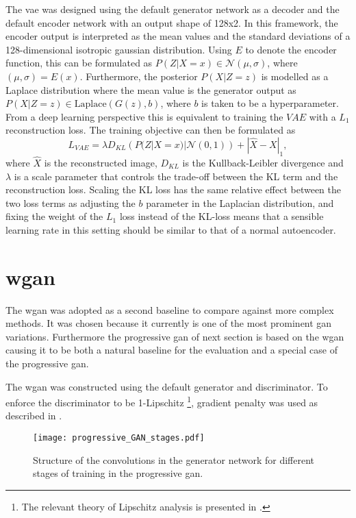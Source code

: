 The \acrlong{vae} was designed using the default generator network as a decoder and the default encoder network with an output shape of 128x2. In this framework, the encoder output is interpreted as the mean values and the standard deviations of a 128-dimensional isotropic gaussian distribution. Using $E$ to denote the encoder function, this can be formulated as $P(Z|X=x) \in \mathcal{N}(\mu, \sigma)$, where $(\mu, \sigma) = E(x)$. Furthermore, the posterior $P(X|Z=z)$ is modelled as a Laplace distribution where the mean value is the generator output as $P(X|Z=z) \in \text{Laplace}(G(z), b)$, where $b$ is taken to be a hyperparameter. From a deep learning perspective this is equivalent to training the $VAE$ with a $L_1$ reconstruction loss. The training objective can then be formulated as 
\begin{equation}
    L_{VAE} = \lambda D_{KL}\left(P(Z|X=x) | \mathcal{N}(0,1)\right) + |\hat{X} - X|_1,
\end{equation}
where $\hat{X}$ is the reconstructed image, $D_{KL}$ is the Kullback-Leibler divergence \parencite{kullback1951information} and $\lambda$ is a scale parameter that controls the trade-off between the KL term and the reconstruction loss. Scaling the KL loss has the same relative effect between the two loss terms as adjusting the $b$ parameter in the Laplacian distribution, and fixing the weight of the $L_1$ loss instead of the KL-loss means that a sensible learning rate in this setting should be similar to that of a normal autoencoder. 

\section{\acrlong{wgan}}
The \acrfull{wgan} was adopted as a second baseline to compare against more complex methods. It was chosen because it currently is one of the most prominent \acrshort{gan} variations. Furthermore the progressive \acrshort{gan} of next section is based on the \acrshort{wgan} causing it to be both a natural baseline for the evaluation and a special case of the progressive \acrshort{gan}. 

The \acrshort{wgan} was constructed using the default generator and discriminator. To enforce the discriminator to be 1-Lipschitz \footnote{The relevant theory of Lipschitz analysis is presented in \parencite{heinonen2005lectures}.}, gradient penalty was used as described in \parencite{gulrajani2017improved}.

\begin{figure}[t]
    \texttt{[image: progressive\_GAN\_stages.pdf]}
    \caption{Structure of the convolutions in the generator network for different stages of training in the progressive \acrshort{gan}.}
    \label{fig:prog_stages}
\end{figure}

